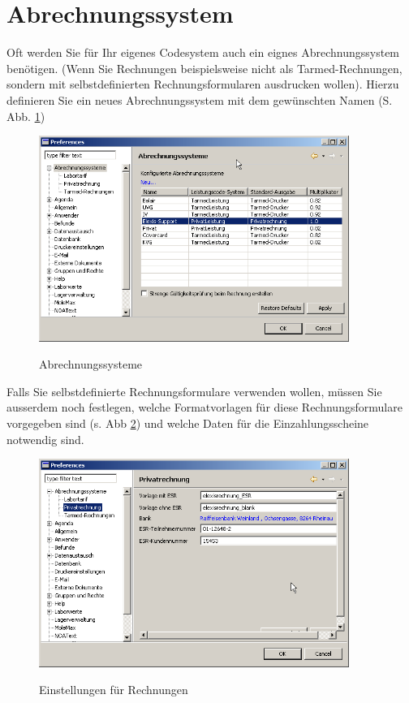 \documentclass[a4paper]{scrartcl}
\begin{document}
\section{Abrechnungssystem}
Oft werden Sie für Ihr eigenes Codesystem auch ein eignes Abrechnungssystem benötigen.  (Wenn Sie Rechnungen beispielsweise nicht als Tarmed-Rechnungen, sondern mit selbstdefinierten Rechnungsformularen ausdrucken wollen).
\medskip
Hierzu definieren Sie ein neues Abrechnungssystem mit dem gewünschten Namen (S. Abb. \ref{fig:privatrechnung2})\\
\begin{figure}
  \center
  \includegraphics[width=0.9\textwidth]{privatrechnung2}\\
  \caption{Abrechnungssysteme}\label{fig:privatrechnung2}
\end{figure}

Falls Sie selbstdefinierte Rechnungsformulare verwenden wollen, müssen Sie ausserdem noch festlegen, welche Formatvorlagen für diese Rechnungsformulare vorgegeben sind (s. Abb \ref{fig:privatrechnung3}) und welche Daten für die Einzahlungsscheine notwendig sind.
\begin{figure}
  \center
  \includegraphics[width=0.9\textwidth]{privatrechnung3}\\
  \caption{Einstellungen für Rechnungen}\label{fig:privatrechnung3}
\end{figure}
\end{document}
